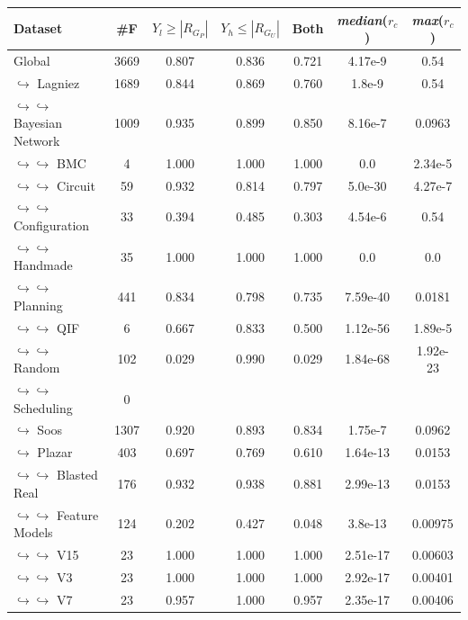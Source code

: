\documentclass{article}
\begin{document}
    
\begin{table}[h!]
        \centering
            \begin{tabular}{l|c|c|c|c|c|c}
                Dataset & \#F & $Y_l \geq |R_{G_P}|$ & $Y_h \leq |R_{G_U}|$ & Both & \textit{median}($r_c$) & \textit{max}($r_c$) \\ 
                \hline 
Global & 3669 & 0.807 & 0.836 & 0.721 & 4.17e-9 & 0.54 \\
$\hookrightarrow$ Lagniez \cite{D4} & 1689 & 0.844 & 0.869 & 0.760 & 1.8e-9 & 0.54 \\
$\hookrightarrow \hookrightarrow$ Bayesian Network & 1009 & 0.935 & 0.899 & 0.850 & 8.16e-7 & 0.0963 \\
$\hookrightarrow \hookrightarrow$ BMC & 4 & 1.000 & 1.000 & 1.000 & 0.0 & 2.34e-5 \\
$\hookrightarrow \hookrightarrow$ Circuit & 59 & 0.932 & 0.814 & 0.797 & 5.0e-30 & 4.27e-7 \\
$\hookrightarrow \hookrightarrow$ Configuration & 33 & 0.394 & 0.485 & 0.303 & 4.54e-6 & 0.54 \\
$\hookrightarrow \hookrightarrow$ Handmade & 35 & 1.000 & 1.000 & 1.000 & 0.0 & 0.0 \\
$\hookrightarrow \hookrightarrow$ Planning & 441 & 0.834 & 0.798 & 0.735 & 7.59e-40 & 0.0181 \\
$\hookrightarrow \hookrightarrow$ QIF & 6 & 0.667 & 0.833 & 0.500 & 1.12e-56 & 1.89e-5 \\
$\hookrightarrow \hookrightarrow$ Random & 102 & 0.029 & 0.990 & 0.029 & 1.84e-68 & 1.92e-23 \\
$\hookrightarrow \hookrightarrow$ Scheduling & 0 & & & & & \\
$\hookrightarrow$ Soos \cite{soos_2024_10449477} & 1307 & 0.920 & 0.893 & 0.834 & 1.75e-7 & 0.0962 \\
$\hookrightarrow$ Plazar \cite{Plazar2019} & 403 & 0.697 & 0.769 & 0.610 & 1.64e-13 & 0.0153 \\
$\hookrightarrow \hookrightarrow$ Blasted Real & 176 & 0.932 & 0.938 & 0.881 & 2.99e-13 & 0.0153 \\
$\hookrightarrow \hookrightarrow$ Feature Models & 124 & 0.202 & 0.427 & 0.048 & 3.8e-13 & 0.00975 \\
$\hookrightarrow \hookrightarrow$ V15 & 23 & 1.000 & 1.000 & 1.000 & 2.51e-17 & 0.00603 \\
$\hookrightarrow \hookrightarrow$ V3 & 23 & 1.000 & 1.000 & 1.000 & 2.92e-17 & 0.00401 \\
$\hookrightarrow \hookrightarrow$ V7 & 23 & 0.957 & 1.000 & 0.957 & 2.35e-17 & 0.00406 \\

\end{tabular}
\end{table}
\end{document}
